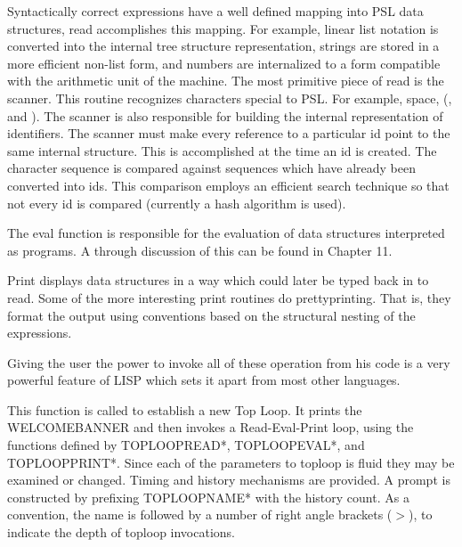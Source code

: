   Syntactically correct expressions have a well defined  mapping
into  PSL  data structures, read accomplishes this mapping.  For
example, linear list notation is  converted  into  the  internal
tree  structure  representation,  strings  are  stored in a more
efficient non-list form, and numbers are internalized to a  form
compatible  with  the  arithmetic unit of the machine.  The most
primitive piece of read is the scanner.  This routine recognizes
characters special to PSL.  For example, space, (, and ).    The
scanner   is   also   responsible   for  building  the  internal
representation of identifiers.   The  scanner  must  make  every
reference  to  a  particular  id  point  to  the  same  internal
structure.  This is accomplished at the time an id  is  created.
The  character sequence is compared against sequences which have
already been converted into ids.   This  comparison  employs  an
efficient  search  technique  so  that  not every id is compared
(currently a hash algorithm is used).

  The eval function is responsible for the  evaluation  of  data
structures  interpreted  as  programs.   A through discussion of
this can be found in Chapter 11.

  Print displays data structures in a way which could  later  be
typed  back  in  to  read.    Some of the more interesting print
routines do prettyprinting.  That is,  they  format  the  output
using  conventions  based  on  the  structural  nesting  of  the
expressions.

  Giving the user the power to invoke  all  of  these  operation
from  his  code is a very powerful feature of LISP which sets it
apart from most other languages.

{
    This function is called to establish a new  Top  Loop.    It
    prints  the WELCOMEBANNER and then invokes a Read-Eval-Print
    loop,  using  the   functions   defined   by   TOPLOOPREAD*,
    TOPLOOPEVAL*,   and   TOPLOOPPRINT*.    Since  each  of  the
    parameters to toploop is  fluid  they  may  be  examined  or
    changed.    Timing  and  history mechanisms are provided.  A
    prompt is constructed by  prefixing  TOPLOOPNAME*  with  the
    history  count.   As a convention, the name is followed by a
    number of right angle brackets ($>$), to indicate the depth of
    toploop invocations.
}

